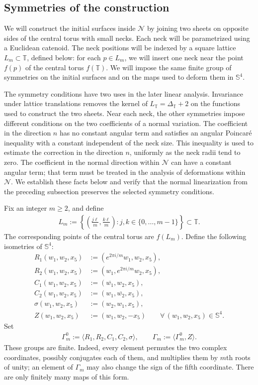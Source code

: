 \documentclass[a4paper,11pt,oneside,reqno]{amsart}
\numberwithin{equation}{section}
\theoremstyle{definition}
\begin{document}
\subsection{Symmetries of the construction}
%
We will construct the initial surfaces inside $\mathcal N$ by
joining two sheets on opposite sides of the central torus with
small necks. Each neck will be parametrized using a Euclidean catenoid.
The neck positions will be indexed by a square lattice
$L_m\subset\mathbb T$, defined below: for each $p\in L_m$,
we will insert one neck near the point $f(p)$ of the
central torus $f(\mathbb T)$. We will impose the same finite group of
symmetries on the initial surfaces and on the maps used to
deform them in $\mathbb S^4$.

The symmetry conditions have two uses in the later linear
analysis. Invariance under lattice translations removes the
kernel of $L_{\mathbb T}=\Delta_{\mathbb T}+2$ on the functions
used to construct the two sheets. Near each neck, the other
symmetries impose different conditions on the two coefficients
of a normal variation. The coefficient in the direction $n$
has no constant angular term and satisfies an angular
Poincar\'e inequality with a constant independent of the neck
size. This inequality is used to estimate the correction in
the direction $n$, uniformly as the neck radii tend to zero.
The coefficient in the normal direction
within $\mathcal N$ can have a constant angular term; that
term must be treated in the analysis of deformations within
$\mathcal N$. We establish these facts below and verify that
the normal linearization from the preceding subsection
preserves the selected symmetry conditions.

Fix an integer $m\geq2$, and define
%
\begin{align}
    \label{eq:s4-lattice}
    L_m:=
    \left\{\left(\frac{j\ell}{m},\frac{k\ell}{m}\right):
    j,k\in\{0,\ldots,m-1\}\right\}\subset\mathbb T.
\end{align}
%
The corresponding points of the central torus are $f(L_m)$.
Define the following isometries of $\mathbb S^4$:
%
\begin{align*}
    R_1(w_1,w_2,x_5)&:=(e^{2\pi i/m}w_1,w_2,x_5),\\
    R_2(w_1,w_2,x_5)&:=(w_1,e^{2\pi i/m}w_2,x_5),\\
    C_1(w_1,w_2,x_5)&:=(\overline{w_1},w_2,x_5),\\
    C_2(w_1,w_2,x_5)&:=(w_1,\overline{w_2},x_5),\\
    \sigma(w_1,w_2,x_5)&:=(w_2,w_1,x_5),\\
    Z(w_1,w_2,x_5)&:=(w_1,w_2,-x_5)
    \qquad\forall\,(w_1,w_2,x_5)\in\mathbb S^4.
\end{align*}
%
Set
%
\begin{align*}
    \Gamma_m^0:=\langle R_1,R_2,C_1,C_2,\sigma\rangle,
    \qquad
    \Gamma_m:=\langle\Gamma_m^0,Z\rangle.
\end{align*}
%
These groups are finite. Indeed, every element permutes the
two complex coordinates, possibly conjugates each of them,
and multiplies them by $m$th roots of unity; an element of
$\Gamma_m$ may also change the sign of the fifth coordinate.
There are only finitely many maps of this form.
\end{document}
